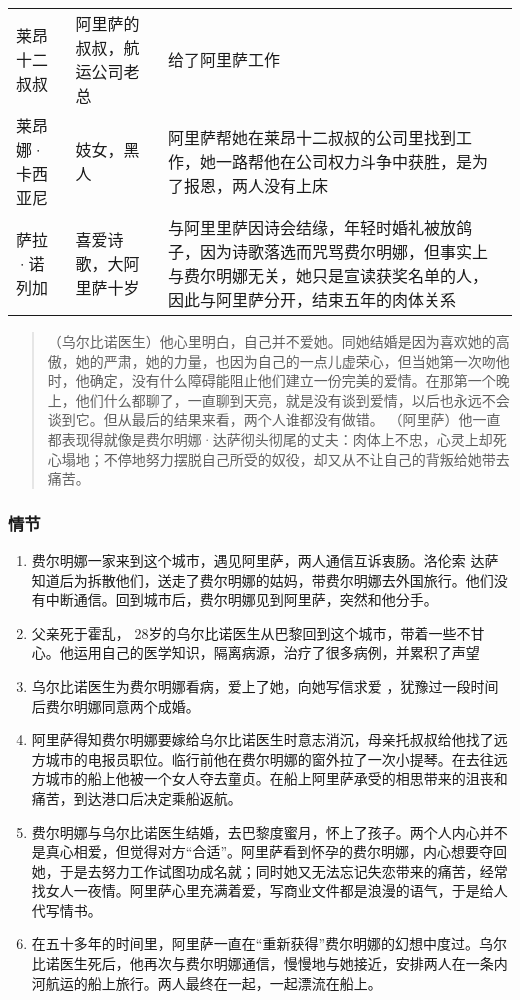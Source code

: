 \begin{longtable}{p{} | p{} | p{}}
莱昂十二叔叔 & 阿里萨的叔叔，航运公司老总  & 给了阿里萨工作 \\
莱昂娜·卡西亚尼 & 妓女，黑人 & 阿里萨帮她在莱昂十二叔叔的公司里找到工作，她一路帮他在公司权力斗争中获胜，是为了报恩，两人没有上床 \\
萨拉·诺列加 & 喜爱诗歌，大阿里萨十岁 & 与阿里里萨因诗会结缘，年轻时婚礼被放鸽子，因为诗歌落选而咒骂费尔明娜，但事实上与费尔明娜无关，她只是宣读获奖名单的人，因此与阿里萨分开，结束五年的肉体关系 \\
\end{longtable}

\begin{quotation}
（乌尔比诺医生）他心里明白，自己并不爱她。同她结婚是因为喜欢她的高傲，她的严肃，她的力量，也因为自己的一点儿虚荣心，但当她第一次吻他时，他确定，没有什么障碍能阻止他们建立一份完美的爱情。在那第一个晚上，他们什么都聊了，一直聊到天亮，就是没有谈到爱情，以后也永远不会谈到它。但从最后的结果来看，两个人谁都没有做错。
（阿里萨）他一直都表现得就像是费尔明娜·达萨彻头彻尾的丈夫：肉体上不忠，心灵上却死心塌地；不停地努力摆脱自己所受的奴役，却又从不让自己的背叛给她带去痛苦。
\end{quotation}


\subsubsection{情节}
\begin{enumerate}
    \item 费尔明娜一家来到这个城市，遇见阿里萨，两人通信互诉衷肠。洛伦索 达萨知道后为拆散他们，送走了费尔明娜的姑妈，带费尔明娜去外国旅行。他们没有中断通信。回到城市后，费尔明娜见到阿里萨，突然和他分手。
    \item 父亲死于霍乱， 28岁的乌尔比诺医生从巴黎回到这个城市，带着一些不甘心。他运用自己的医学知识，隔离病源，治疗了很多病例，并累积了声望
    \item 乌尔比诺医生为费尔明娜看病，爱上了她，向她写信求爱 ，犹豫过一段时间后费尔明娜同意两个成婚。
    \item 阿里萨得知费尔明娜要嫁给乌尔比诺医生时意志消沉，母亲托叔叔给他找了远方城市的电报员职位。临行前他在费尔明娜的窗外拉了一次小提琴。在去往远方城市的船上他被一个女人夺去童贞。在船上阿里萨承受的相思带来的沮丧和痛苦，到达港口后决定乘船返航。
    \item 费尔明娜与乌尔比诺医生结婚，去巴黎度蜜月，怀上了孩子。两个人内心并不是真心相爱，但觉得对方“合适”。阿里萨看到怀孕的费尔明娜，内心想要夺回她，于是去努力工作试图功成名就；同时她又无法忘记失恋带来的痛苦，经常找女人一夜情。阿里萨心里充满着爱，写商业文件都是浪漫的语气，于是给人代写情书。
    \item 在五十多年的时间里，阿里萨一直在“重新获得”费尔明娜的幻想中度过。乌尔比诺医生死后，他再次与费尔明娜通信，慢慢地与她接近，安排两人在一条内河航运的船上旅行。两人最终在一起，一起漂流在船上。
\end{enumerate}

